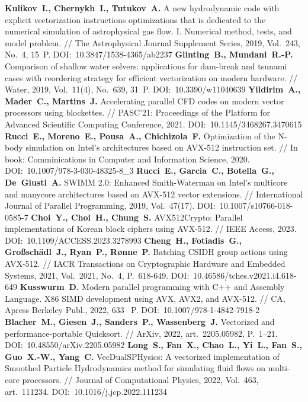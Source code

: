 \begin{thebibliography}{99}
\textbf{Kulikov~I., Chernykh~I., Tutukov~A.} A new hydrodynamic code with explicit vectorization instructions optimizations that is dedicated to the numerical simulation of astrophysical gas flow. I. Numerical method, tests, and model problem. // The Astrophysical Journal Supplement Series, 2019, Vol.~243, No.~4, 15~P. DOI:~10.3847/1538-4365/ab2237
\textbf{Glinting~B., Mundani~R.-P.} Comparison of shallow water solvers: applications for dam-break and tsunami cases with reordering strategy for efficient vectorization on modern hardware. // Water, 2019, Vol.~11(4), No.~639, 31~P. DOI:~10.3390/w11040639
\textbf{Yildirim~A., Mader~C., Martins~J.} Accelerating parallel CFD codes on modern vector processors using blockettes. // PASC’21: Proceedings of the Platform for Advanced Scientific Computing Conference, 2021. DOI:~10.1145/3468267.3470615
\textbf{Rucci~E., Moreno~E., Pousa~A., Chichizola~F.} Optimization of the N-body simulation on Intel’s architectures based on AVX-512 instruction set. // In book: Comminications in Computer and Information Science, 2020. DOI:~10.1007/978-3-030-48325-8\_3
\textbf{Rucci~E., Garcia~C., Botella~G., De~Giusti~A.} SWIMM 2.0: Enhanced Smith-Waterman on Intel’s multicore and manycore architectures based on AVX-512 vector extensions. // International Journal of Parallel Programming, 2019, Vol.~47(17). DOI:~10.1007/s10766-018-0585-7
\textbf{Choi~Y., Choi~H., Chung~S.} AVX512Crypto: Parallel implementations of Korean block ciphers using AVX-512. // IEEE Access, 2023. DOI:~10.1109/ACCESS.2023.3278993
\textbf{Cheng~H., Fotiadis~G., Gro{\ss}sch{\"a}dl~J., Ryan~P., R{\o}nne~P.} Batching CSIDH group actions using AVX-512. // IACR Transactions on Cryptographic Hardware and Embedded Systems, 2021, Vol.~2021, No.~4, P.~618-649. DOI:~10.46586/tches.v2021.i4.618-649
\textbf{Kusswurm~D.} Modern parallel programming with C++ and Assembly Language. X86 SIMD development using AVX, AVX2, and AVX-512. // CA, Apress Berkeley Publ., 2022, 633~ P. DOI:~10.1007/978-1-4842-7918-2
\textbf{Blacher~M., Giesen~J., Sanders~P., Wassenberg~J.} Vectorized and performance-portable Quicksort. // ArXiv, 2022, art.~2205.05982, P.~1–21. DOI:~10.48550/arXiv.2205.05982
\textbf{Long~S., Fan~X., Chao~L., Yi~L., Fan~S., Guo~X.-W., Yang~C.} VecDualSPHysics: A vectorized implementation of Smoothed Particle Hydrodynamics method for simulating fluid flows on multi-core processors. // Journal of Computational Physics, 2022, Vol.~463, art.~111234. DOI:~10.1016/j.jcp.2022.111234

\end{thebibliography}
